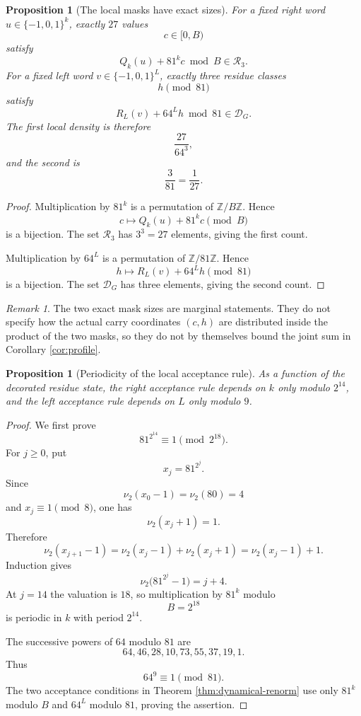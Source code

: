 \documentclass[11pt]{article}
\newtheorem{proposition}[theorem]{Proposition}
\theoremstyle{remark}
\newtheorem{remark}[theorem]{Remark}
\newcommand{\Z}{\mathbb{Z}}
\newcommand{\E}{\{-1,0,1\}}
\newcommand{\Rset}{\mathcal{R}}
\newcommand{\Dset}{\mathcal{D}}
\begin{document}
\begin{proposition}[The local masks have exact sizes]
\label{prop:mask-sizes}
For a fixed right word $u\in\E^k$, exactly $27$ values
\[
c\in[0,B)
\]
satisfy
\[
Q_k(u)+81^kc\bmod B\in\Rset_3.
\]
For a fixed left word $v\in\E^L$, exactly three residue classes
\[
h\pmod{81}
\]
satisfy
\[
R_L(v)+64^Lh\bmod81\in\Dset_G.
\]
The first local density is therefore
\[
\frac{27}{64^3},
\]
and the second is
\[
\frac{3}{81}=\frac1{27}.
\]
\end{proposition}

\begin{proof}
Multiplication by $81^k$ is a permutation of $\Z/B\Z$.  Hence
\[
c\longmapsto Q_k(u)+81^kc\pmod B
\]
is a bijection.  The set $\Rset_3$ has $3^3=27$ elements, giving the first count.

Multiplication by $64^L$ is a permutation of $\Z/81\Z$.  Hence
\[
h\longmapsto R_L(v)+64^Lh\pmod{81}
\]
is a bijection.  The set $\Dset_G$ has three elements, giving the second count.
\end{proof}

\begin{remark}
The two exact mask sizes are marginal statements.  They do not specify how the actual carry coordinates $(c,h)$ are distributed inside the product of the two masks, so they do not by themselves bound the joint sum in Corollary \ref{cor:profile}.
\end{remark}

\begin{proposition}[Periodicity of the local acceptance rule]
\label{prop:periods}
As a function of the decorated residue state, the right acceptance rule depends on $k$ only modulo $2^{14}$, and the left acceptance rule depends on $L$ only modulo $9$.
\end{proposition}

\begin{proof}
We first prove
\[
81^{2^{14}}\equiv1\pmod{2^{18}}.
\]
For $j\ge0$, put
\[
x_j=81^{2^j}.
\]
Since
\[
\nu_2(x_0-1)=\nu_2(80)=4
\]
and $x_j\equiv1\pmod8$, one has
\[
\nu_2(x_j+1)=1.
\]
Therefore
\[
\nu_2(x_{j+1}-1)
=
\nu_2(x_j-1)+\nu_2(x_j+1)
=
\nu_2(x_j-1)+1.
\]
Induction gives
\[
\nu_2\bigl(81^{2^j}-1\bigr)=j+4.
\]
At $j=14$ the valuation is $18$, so multiplication by $81^k$ modulo
\[
B=2^{18}
\]
is periodic in $k$ with period $2^{14}$.

The successive powers of $64$ modulo $81$ are
\[
64,46,28,10,73,55,37,19,1.
\]
Thus
\[
64^9\equiv1\pmod{81}.
\]
The two acceptance conditions in Theorem \ref{thm:dynamical-renorm} use only $81^k$ modulo $B$ and $64^L$ modulo $81$, proving the assertion.
\end{proof}
\end{document}
